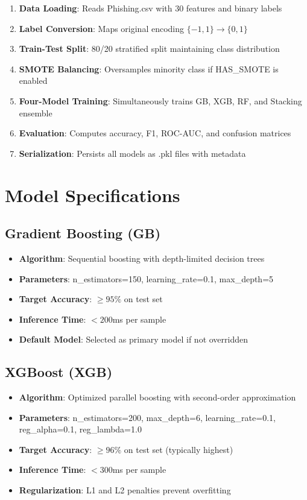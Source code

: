 \documentclass[12pt,a4paper]{report}
\begin{document}
\begin{enumerate}[leftmargin=*]
    \item \textbf{Data Loading}: Reads Phishing.csv with 30 features and binary labels
    \item \textbf{Label Conversion}: Maps original encoding $\{-1, 1\} \to \{0, 1\}$
    \item \textbf{Train-Test Split}: 80/20 stratified split maintaining class distribution
    \item \textbf{SMOTE Balancing}: Oversamples minority class if HAS\_SMOTE is enabled
    \item \textbf{Four-Model Training}: Simultaneously trains GB, XGB, RF, and Stacking ensemble
    \item \textbf{Evaluation}: Computes accuracy, F1, ROC-AUC, and confusion matrices
    \item \textbf{Serialization}: Persists all models as .pkl files with metadata
\end{enumerate}

\section{Model Specifications}

\subsection{Gradient Boosting (GB)}
\begin{itemize}[leftmargin=*]
    \item \textbf{Algorithm}: Sequential boosting with depth-limited decision trees
    \item \textbf{Parameters}: n\_estimators=150, learning\_rate=0.1, max\_depth=5
    \item \textbf{Target Accuracy}: $\geq 95\%$ on test set
    \item \textbf{Inference Time}: $<200$ms per sample
    \item \textbf{Default Model}: Selected as primary model if not overridden
\end{itemize}

\subsection{XGBoost (XGB)}
\begin{itemize}[leftmargin=*]
    \item \textbf{Algorithm}: Optimized parallel boosting with second-order approximation
    \item \textbf{Parameters}: n\_estimators=200, max\_depth=6, learning\_rate=0.1, reg\_alpha=0.1, reg\_lambda=1.0
    \item \textbf{Target Accuracy}: $\geq 96\%$ on test set (typically highest)
    \item \textbf{Inference Time}: $<300$ms per sample
    \item \textbf{Regularization}: L1 and L2 penalties prevent overfitting
\end{itemize}
\end{document}
